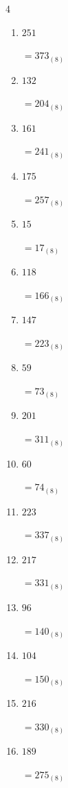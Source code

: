 \begin{multicols}{4}
\begin{enumerate}
  \item $251$

        $=373_{(8)}$

  \item $132$

        $=204_{(8)}$

  \item $161$

        $=241_{(8)}$

  \item $175$

        $=257_{(8)}$

  \item $15$

        $=17_{(8)}$

  \item $118$

        $=166_{(8)}$

  \item $147$

        $=223_{(8)}$

  \item $59$

        $=73_{(8)}$

  \item $201$

        $=311_{(8)}$

\columnbreak %

\resetques

  \item $60$

        $=74_{(8)}$

  \item $223$

        $=337_{(8)}$

  \item $217$

        $=331_{(8)}$

  \item $96$

        $=140_{(8)}$

  \item $104$

        $=150_{(8)}$

  \item $216$

        $=330_{(8)}$

  \item $189$

        $=275_{(8)}$


\end{enumerate}
\end{multicols}
